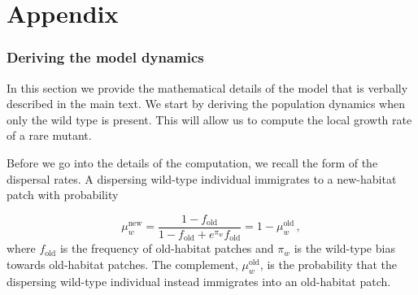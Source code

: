 \documentclass[11pt]{article}
\begin{document}
\clearpage


\renewcommand*{\thepage}{S\arabic{page}}

\renewcommand\theequation{S\arabic{equation}}
\renewcommand\thesection{S\arabic{section}}
\renewcommand\thefigure{S\arabic{figure}}

\resetlinenumber
\renewcommand\thelinenumber{S\arabic{linenumber}}
\linenumbers{}
\modulolinenumbers[2]

\appendix 


\part{Appendix} %
\parttoc %





\clearpage

\renewcommand{\theequation}{A\arabic{equation}}
\setcounter{equation}{0}  %
\renewcommand{\thetable}{A\arabic{table}}
\setcounter{figure}{0}
\setcounter{table}{0}

\section{Deriving the model dynamics \label{sec:app:modeldyn}}
In this section we provide the mathematical details of the model that is verbally described in the main text. We start by deriving the population dynamics when only the wild type is present. This will allow us to compute the local growth rate of a rare mutant.  

Before we go into the details of the computation, we recall the form of the dispersal rates. A dispersing wild-type individual immigrates to a new-habitat patch with probability

\begin{equation}\label{Seq:dispersal_rates_old}
\mu_w^{\text{new}} = \frac{1-f_{\text{old}}}{1-f_{\text{old}} + e^{\pi_w} f_{\text{old}}} = 1 - \mu_w^{\text{old}} \, ,
\end{equation}
%
where $f_{\text{old}}$ is the frequency of old-habitat patches and $\pi_w$ is the wild-type bias towards old-habitat patches. The complement, $\mu_w^{\text{old}}$, is the probability that the dispersing wild-type individual instead immigrates into an old-habitat patch. 
\end{document}
